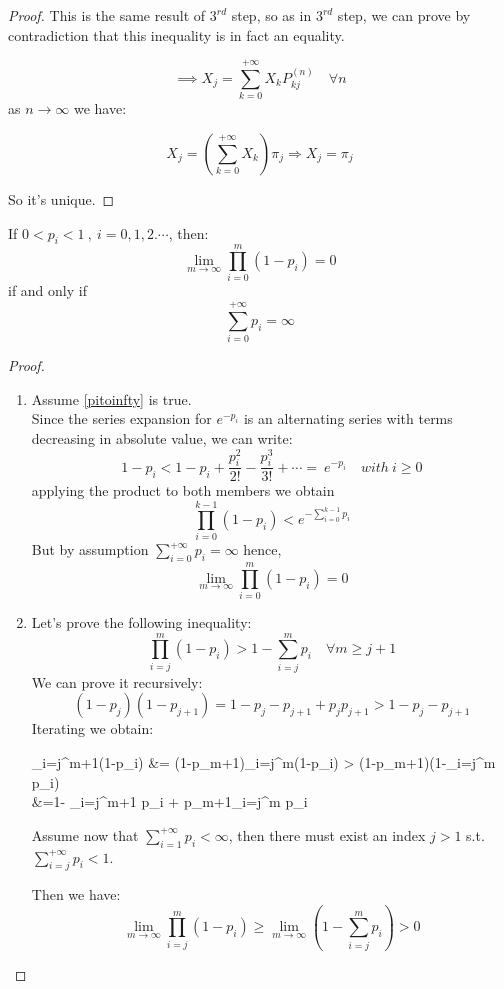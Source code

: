\begin{proof}
			This is the same result of $3^{rd}$ step, so as in $3^{rd}$ step, we can prove by contradiction that this inequality is in fact an equality.

			$$ \implies X_j = \sum\limits_{k=0}^{+\infty} X_k P_{kj}^{(n)} \quad \forall n $$
			as $n \to \infty$ we have:

			\begin{equation}
				X_j = (\sum\limits_{k=0}^{+\infty} X_k ) \pi_j \Rightarrow X_j = \pi_j
			\end{equation}

			So it's unique.
	\end{proof}

	\begin{lemma}
	  If $0 < p_i < 1 ~,~ i=0,1,2.\cdots $, then:
		\begin{equation}\label{limprodpi}
			\lim_{m \to \infty} \prod_{i=0}^{m}(1-p_i) = 0
		\end{equation}
		if and only if
		\begin{equation}\label{pitoinfty}
			\sum\limits_{i=0}^{+\infty} p_i = \infty
		\end{equation}
	\end{lemma}

	\begin{proof}
		\begin{enumerate}
			\item Assume \eqref{pitoinfty} is true. \\
				Since the series expansion for $e^{-p_i}$ is an alternating series with terms decreasing in absolute value, we can write:
				\begin{equation}
					1-p_i < 1-p_i + \frac{p_i^2}{2!} - \frac{p_i^3}{3!} + \cdots = ~e^{-p_i} \quad with ~i\ge 0
				\end{equation}
				applying the product to both members we obtain
				\begin{equation}
					\prod_{i=0}^{k-1} (1-p_i) < e^{-\sum\limits_{i=0}^{k-1}p_i}
				\end{equation}
				But by assumption $\sum\limits_{i=0}^{+\infty} p_i = \infty$ hence,
				$$ \lim_{m \to \infty} \prod_{i=0}^{m}(1-p_i) = 0 $$

			\item Let's prove the following inequality:
			$$ \prod_{i=j}^m(1-p_i) > 1-\sum\limits_{i=j}^m p_i \quad \forall m \ge j+1$$
			We can prove it recursively:
			$$(1-p_j)(1-p_{j+1}) = 1-p_j - p_{j+1} + p_j p_{j+1} > 1-p_j - p_{j+1}$$
			Iterating we obtain:
			\begin{esp*}
				\prod_{i=j}^{m+1}(1-p_i) &= (1-p_{m+1})\prod_{i=j}^m(1-p_i) > (1-p_{m+1})(1-\sum\limits_{i=j}^m p_i)  \\
				&=1- \sum\limits_{i=j}^{m+1} p_i + p_{m+1}\sum\limits_{i=j}^m p_i
			\end{esp*}

			Assume now that $\sum\limits_{i=1}^{+\infty} p_i < \infty$, then there must exist an index $j>1$ s.t. $\sum\limits_{i=j}^{+\infty} p_i < 1$.

			Then we have:
			$$ \lim_{m \to \infty} \prod_{i=j}^m (1-p_i) \ge \lim_{m \to \infty} (1-\sum\limits_{i=j}^m p_i) > 0 $$
		\end{enumerate}
	\end{proof}

